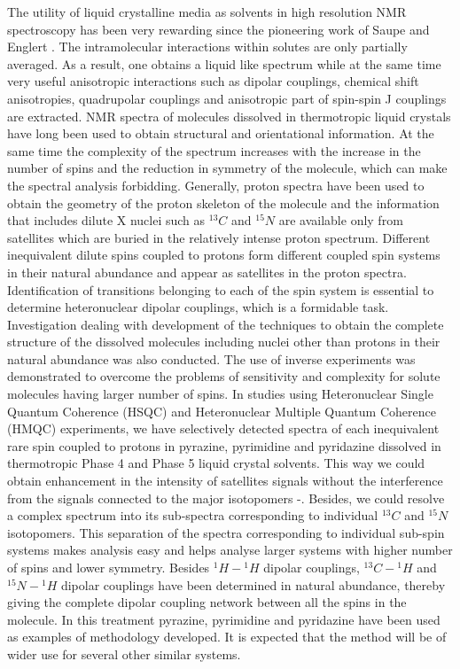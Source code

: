 The utility of liquid crystalline media as solvents in high resolution NMR
spectroscopy has been very rewarding since the pioneering work of Saupe and
Englert \cite{chap31-key12}. The intramolecular interactions within solutes are only partially
averaged. As a result, one obtains a liquid like spectrum while at the same time
very useful anisotropic interactions such as dipolar couplings, chemical shift
anisotropies, quadrupolar couplings and anisotropic part of spin-spin J couplings
are extracted. NMR spectra of molecules dissolved in thermotropic liquid crystals
have long been used to obtain structural and orientational information. At the
same time the complexity of the spectrum increases with the increase in the
number of spins and the reduction in symmetry of the molecule, which can make
the spectral analysis forbidding. Generally, proton spectra have been used to
obtain the geometry of the proton skeleton of the molecule and the information
that includes dilute X nuclei such as ${}^{13}C$ and ${}^{15} N$ are available only from satellites
which are buried in the relatively intense proton spectrum. Different inequivalent
dilute spins coupled to protons form different coupled spin systems in their
natural abundance and appear as satellites in the proton spectra. Identification of
transitions belonging to each of the spin system is essential to determine
heteronuclear dipolar couplings, which is a formidable task. Investigation dealing
with development of the techniques to obtain the complete structure of the
dissolved molecules including nuclei other than protons in their natural
abundance was also conducted. The use of inverse experiments was demonstrated
to overcome the problems of sensitivity and complexity for solute molecules
having larger number of spins. In studies using Heteronuclear Single Quantum
Coherence (HSQC) and Heteronuclear Multiple Quantum Coherence (HMQC)
experiments, we have selectively detected spectra of each inequivalent rare spin
coupled to protons in pyrazine, pyrimidine and pyridazine dissolved in
thermotropic Phase 4 and Phase 5 liquid crystal solvents. This way we could
obtain enhancement in the intensity of satellites signals without the interference
from the signals connected to the major isotopomers \cite{chap31-key13}-\cite{chap31-key14}. Besides, we could
resolve a complex spectrum into its sub-spectra corresponding to individual ${}^{13}C$
and ${}^{15} N$ isotopomers. This separation of the spectra corresponding to individual
sub-spin systems makes analysis easy and helps analyse larger systems with
higher number of spins and lower symmetry. Besides ${}^1 H-{}^1 H$ dipolar couplings,
${}^{13} C- {}^1 H$ and ${}^{15} N- {}^1 H$ dipolar couplings have been determined in natural abundance,
thereby giving the complete dipolar coupling network between all the spins in the
molecule. In this treatment pyrazine, pyrimidine and pyridazine have been used
as examples of methodology developed. It is expected that the method will be of
wider use for several other similar systems.

